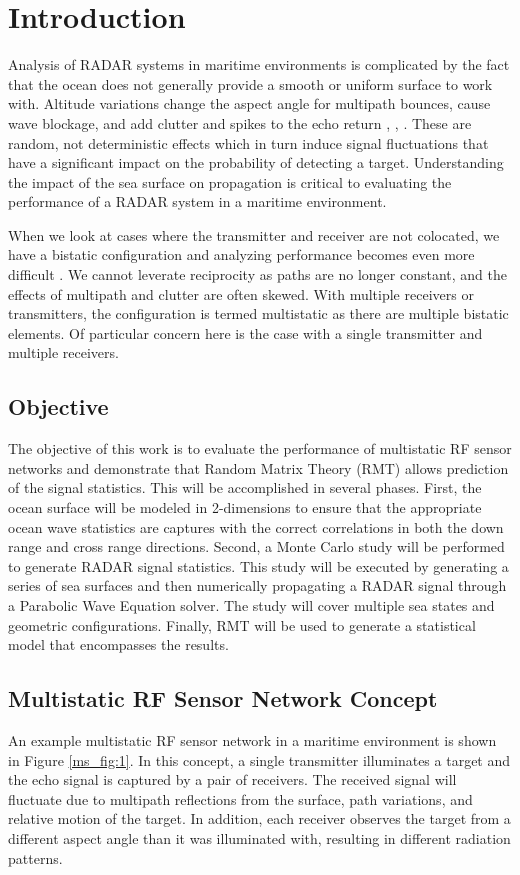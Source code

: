 \chapter{Introduction}
Analysis of RADAR systems in maritime environments is complicated by the fact that the ocean does not generally provide a smooth or uniform surface to work with. Altitude variations change the aspect angle for multipath bounces, cause wave blockage, and add clutter and spikes to the echo return \cite{skolnik_handbook}, \cite{blake_radar}, \cite{nathanson_radar}. These are random, not deterministic effects which in turn induce signal fluctuations that have a significant impact on the probability of detecting a target. Understanding the impact of the sea surface on propagation is critical to evaluating the performance of a RADAR system in a maritime environment.

When we look at cases where the transmitter and receiver are not colocated, we have a bistatic configuration and analyzing performance becomes even more difficult \cite{willis_bistatic}. We cannot leverate reciprocity as paths are no longer constant, and the effects of multipath and clutter are often skewed. With multiple receivers or transmitters, the configuration is termed multistatic as there are multiple bistatic elements. Of particular concern here is the case with a single transmitter and multiple receivers.

\section{Objective}
The objective of this work is to evaluate the performance of multistatic RF sensor networks and demonstrate that Random Matrix Theory (RMT) allows prediction of the signal statistics. This will be accomplished in several phases. First, the ocean surface will be modeled in 2-dimensions to ensure that the appropriate ocean wave statistics are captures with the correct correlations in both the down range and cross range directions. Second, a Monte Carlo study will be performed to generate RADAR signal statistics. This study will be executed by generating a series of sea surfaces and then numerically propagating a RADAR signal through a Parabolic Wave Equation solver. The study will cover multiple sea states and geometric configurations. Finally, RMT will be used to generate a statistical model that encompasses the results.

\section{Multistatic RF Sensor Network Concept}
An example multistatic RF sensor network in a maritime environment is shown in Figure \ref{ms_fig:1}. In this concept, a single transmitter illuminates a target and the echo signal is captured by a pair of receivers. The received signal will fluctuate due to multipath reflections from the surface, path variations, and relative motion of the target. In addition, each receiver observes the target from a different aspect angle than it was illuminated with, resulting in different radiation patterns.


